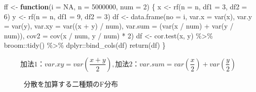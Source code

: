 \documentclass[a4paper]{tufte-handout}
\newenvironment{Shaded}{}{}
\newcommand{\AttributeTok}[1]{\textcolor[rgb]{0.49,0.56,0.16}{#1}}
\newcommand{\ConstantTok}[1]{\textcolor[rgb]{0.53,0.00,0.00}{#1}}
\newcommand{\ControlFlowTok}[1]{\textcolor[rgb]{0.00,0.44,0.13}{\textbf{#1}}}
\newcommand{\DecValTok}[1]{\textcolor[rgb]{0.25,0.63,0.44}{#1}}
\newcommand{\FunctionTok}[1]{\textcolor[rgb]{0.02,0.16,0.49}{#1}}
\newcommand{\NormalTok}[1]{#1}
\newcommand{\OtherTok}[1]{\textcolor[rgb]{0.00,0.44,0.13}{#1}}
\newcommand{\SpecialCharTok}[1]{\textcolor[rgb]{0.25,0.44,0.63}{#1}}
\begin{document}
\begin{Shaded}
\begin{Highlighting}[numbers=left,,]
\NormalTok{ff }\OtherTok{\textless{}{-}} \ControlFlowTok{function}\NormalTok{(}\AttributeTok{i =} \ConstantTok{NA}\NormalTok{, }\AttributeTok{n =} \DecValTok{5000000}\NormalTok{, }\AttributeTok{num =} \DecValTok{2}\NormalTok{) \{}
\NormalTok{  x }\OtherTok{\textless{}{-}} \FunctionTok{rf}\NormalTok{(}\AttributeTok{n =}\NormalTok{ n, }\AttributeTok{df1 =} \DecValTok{3}\NormalTok{, }\AttributeTok{df2 =} \DecValTok{6}\NormalTok{)}
\NormalTok{  y }\OtherTok{\textless{}{-}} \FunctionTok{rf}\NormalTok{(}\AttributeTok{n =}\NormalTok{ n, }\AttributeTok{df1 =} \DecValTok{9}\NormalTok{, }\AttributeTok{df2 =} \DecValTok{3}\NormalTok{)}
\NormalTok{  df }\OtherTok{\textless{}{-}} \FunctionTok{data.frame}\NormalTok{(}\AttributeTok{no =}\NormalTok{ i,}
                   \AttributeTok{var.x =} \FunctionTok{var}\NormalTok{(x), }\AttributeTok{var.y =} \FunctionTok{var}\NormalTok{(y),}
                   \AttributeTok{var.xy =} \FunctionTok{var}\NormalTok{((x }\SpecialCharTok{+}\NormalTok{ y) }\SpecialCharTok{/}\NormalTok{ num), }\AttributeTok{var.sum =}\NormalTok{ (}\FunctionTok{var}\NormalTok{(x }\SpecialCharTok{/}\NormalTok{ num) }\SpecialCharTok{+} \FunctionTok{var}\NormalTok{(y }\SpecialCharTok{/}\NormalTok{ num)),}
                   \AttributeTok{cov2 =} \FunctionTok{cov}\NormalTok{(x }\SpecialCharTok{/}\NormalTok{ num, y }\SpecialCharTok{/}\NormalTok{ num) }\SpecialCharTok{*} \DecValTok{2}\NormalTok{)}
\NormalTok{  df }\OtherTok{\textless{}{-}} \FunctionTok{cor.test}\NormalTok{(x, y) }\SpecialCharTok{\%\textgreater{}\%}\NormalTok{ broom}\SpecialCharTok{::}\FunctionTok{tidy}\NormalTok{() }\SpecialCharTok{\%\textgreater{}\%}\NormalTok{ dplyr}\SpecialCharTok{::}\FunctionTok{bind\_cols}\NormalTok{(df)}
  \FunctionTok{return}\NormalTok{(df)}
\NormalTok{\}}
\end{Highlighting}
\end{Shaded}

\[\mbox{加法1：}var.xy = var(\frac{x + y}{2}),　\mbox{加法2：}var.sum = var(\frac{x}{2}) + var(\frac{y}{2})\]

\begin{figure}

{\centering {}

}

\caption[分散を加算する二種類のF分布]{分散を加算する二種類のF分布}\label{fig:unnamed-chunk-9}
\end{figure}
\end{document}
